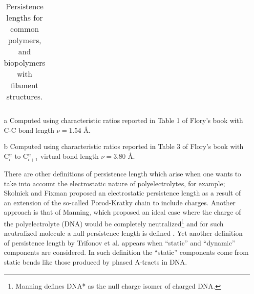 \begin{table}[htbp]
\begin{center}
\begin{threeparttable}
\begin{tabular}{l|r|c}
\hline
\end{tabular}
\begin{tablenotes}
\item [a] Computed using  characteristic ratios reported in Table 1
  of Flory's book \cite{flory1969} with C-C bond length $\nu = 1.54$ \AA.
\item [b] Computed using  characteristic ratios reported in Table 3
  of Flory's book \cite{flory1969} with C$^{\alpha}_{i}$ to C$^{\alpha}_{i+1}$ virtual
  bond length $\nu = 3.80$ \AA.
\end{tablenotes}
\end{threeparttable}
\caption{Persistence lengths for common polymers, and biopolymers with
  filament structures.}
\label{tab:perval}
\end{center}
\end{table}


There are other definitions of persistence length which arise when one
wants   to   take   into   account   the   electrostatic   nature   of
polyelectrolytes, for example; Skolnick and Fixman \cite{skolnick1977}
proposed  an  electrostatic  persistence  length  as a  result  of  an
extension  of the  so-called  Porod-Kratky chain  to include  charges.
Another  approach is  that of  Manning, which  proposed an  ideal case
where  the charge  of the  polyelectrolyte (DNA)  would  be completely
neutralized\footnote{Manning defines DNA* as the null charge isomer of
  charged DNA.}  and for  such neutralized molecule a null persistence
length  is  defined  \cite{manning2006}.   Yet another  definition  of
persistence length by Trifonov et al. \cite{trifonov1987} appears when
``static''  and  ``dynamic''   components  are  considered.   In  such
definition the ``static'' components come from static bends like those
produced by phased A-tracts in DNA.

